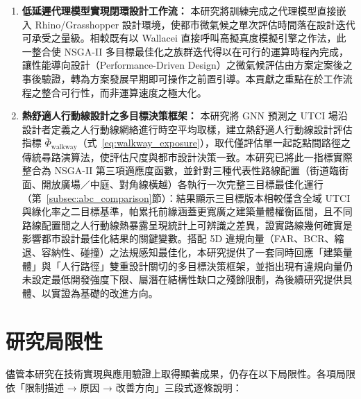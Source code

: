 \begin{enumerate}
    \item \textbf{低延遲代理模型實現閉環設計工作流：}
    本研究將訓練完成之代理模型直接嵌入 Rhino/Grasshopper 設計環境，使都市微氣候之單次評估時間落在設計迭代可承受之量級。相較既有以 Wallacei 直接呼叫高擬真度模擬引擎之作法，此一整合使 NSGA-II 多目標最佳化之族群迭代得以在可行的運算時程內完成，讓性能導向設計（Performance-Driven Design）之微氣候評估由方案定案後之事後驗證，轉為方案發展早期即可操作之前置引導。本貢獻之重點在於工作流程之整合可行性，而非運算速度之極大化。

    \item \textbf{熱舒適人行動線設計之多目標決策框架：}
    本研究將 GNN 預測之 UTCI 場沿設計者定義之人行動線網絡進行時空平均取樣，建立熱舒適人行動線設計評估指標 $\bar{\Phi}_{\text{walkway}}$（式~\eqref{eq:walkway_exposure}），取代僅評估單一起訖點間路徑之傳統尋路演算法，使評估尺度與都市設計決策一致。本研究已將此一指標實際整合為 NSGA-II 第三項適應度函數，並針對三種代表性路線配置（街道臨街面、開放廣場／中庭、對角線橫越）各執行一次完整三目標最佳化運行（第~\ref{subsec:abc_comparison}節）：結果顯示三目標版本相較僅含全域 UTCI 與綠化率之二目標基準，帕累托前緣涵蓋更寬廣之建築量體權衡區間，且不同路線配置間之人行動線熱暴露呈現統計上可辨識之差異，證實路線幾何確實是影響都市設計最佳化結果的關鍵變數。搭配 5D 違規向量（FAR、BCR、縮退、容納性、碰撞）之法規感知最佳化，本研究提供了一套同時回應「建築量體」與「人行路徑」雙重設計關切的多目標決策框架，並指出現有違規向量仍未設定最低開發強度下限、屬潛在結構性缺口之殘餘限制，為後續研究提供具體、以實證為基礎的改進方向。
\end{enumerate}


\section{研究局限性}
\label{sec:limitations}

儘管本研究在技術實現與應用驗證上取得顯著成果，仍存在以下局限性。各項局限依「限制描述 → 原因 → 改善方向」三段式逐條說明：

